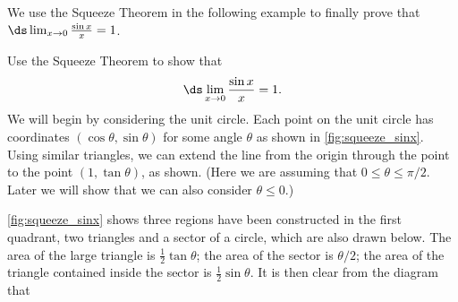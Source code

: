 We use the Squeeze Theorem in the following example to finally prove that $\ds \lim_{x\to 0} \frac{\sin x}{x} = 1$.

\begin{example}\label{ex_limit_sinx_prove}
Use the Squeeze Theorem to show that
\[\ds \lim_{x\to 0} \frac{\sin x}{x} = 1.\]
\solution
We will begin by considering the unit circle. Each point on the unit circle has coordinates $(\cos \theta,\sin \theta)$ for some angle $\theta$ as shown in \autoref{fig:squeeze_sinx}. Using similar triangles, we can extend the line from the origin through the point to the point $(1,\tan \theta)$, as shown. (Here we are assuming that $0\leq \theta \leq \pi/2$. Later we will show that we can also consider $\theta \leq 0$.)


\autoref{fig:squeeze_sinx} shows three regions have been constructed in the first quadrant, two triangles and a sector of a circle, which are also drawn below. The area of the large triangle is $\frac12\tan\theta$; the area of the sector is $\theta/2$; the area of the triangle contained inside the sector is $\frac12\sin\theta$. It is then clear from the diagram that 


\end{example}
